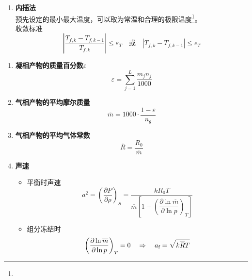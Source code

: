 \begin{enumerate}[\hspace*{1.5em} (1)]
	\item \textbf{内插法}\\
	\hspace*{2em}  预先设定的最小最大温度，可以取为常温和合理的极限温度\footnote[1]{}。\\
	收敛标准
	\begin{equation}
		\left|\dfrac{T_{f,k}-T_{f,k-1}}{T_{f,k}}\right| \le \varepsilon_T \quad \mbox{或} \quad \left|T_{f,k} - T_{f, k - 1}\right| \le e_T
	\end{equation}
\end{enumerate}
\vspace*{0.5em}

\sssection[燃烧产物的热力学性质]
\begin{enumerate}[\hspace*{2em} (1) ]
	\item \textbf{凝相产物的质量百分数$\varepsilon$}
	\begin{equation}
		\varepsilon = \sum_{j = 1}^{L} \dfrac{m_j n_j}{1000}
	\end{equation}
	
	\item \textbf{气相产物的平均摩尔质量}
	\begin{equation}
		\overline{m} = 1000 \cdot \dfrac{1 - \varepsilon}{n_g}
	\end{equation}
	
	\item \textbf{气相产物的平均气体常数}
	\begin{equation}
		\overline{R} = \dfrac{R_0}{\overline{m}}
	\end{equation}

	\item \textbf{声速}
	\begin{itemize}
		\item 平衡时声速
		\begin{equation}
			a^2 = \left(\dfrac{\partial P}{\partial \rho}\right)_S = \dfrac{kR_0 T}{\overline{m}\left[1 + \left(\dfrac{\partial \ln \overline{m}}{\partial \ln p}\right)_T\right]}
		\end{equation}
		\item 组分冻结时
		\begin{equation}
			\left(\dfrac{\partial \ln \overline{m}}{\partial \ln p}\right)_T = 0 \quad \Rightarrow \quad a_{\text{f}} = \sqrt{k\overline{R}T}
		\end{equation}
	\end{itemize}


\end{enumerate}
